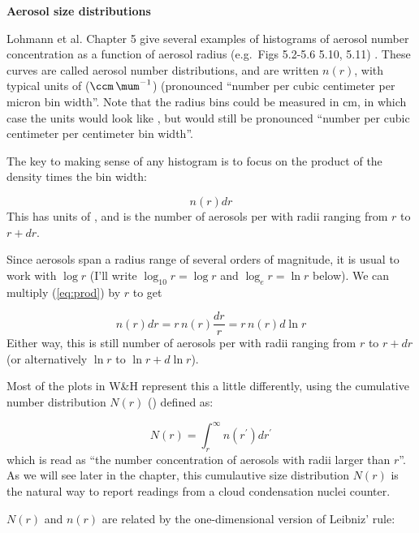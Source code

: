 \documentclass[12pt]{article}
\begin{document}
\pagestyle{first}

\vspace{0.1in}
\noindent
\textbf{Aerosol size distributions}
\vspace{0.1in}

Lohmann et al. Chapter 5  give several examples of histograms of aerosol
number concentration as a function of aerosol radius (e.g.~Figs 5.2-5.6
5.10, 5.11) .  These curves are called aerosol number distributions,
and are written $n(r)$, with typical units of ($\ccm\, \mum^{-1}$)
(pronounced ``number per cubic centimeter per micron bin width''.
Note that the radius bins could be measured in cm, in which case the
units would look like , but would still be pronounced
``number per cubic centimeter per centimeter bin width''.

The key to making sense of any histogram is to focus on the product of
the density times the bin width:

\begin{equation}
  \label{eq:prod}
  n(r)dr
\end{equation}
This has units of \ccm, and is the number of aerosols per \cc with radii
ranging from $r$ to $r+dr$.

Since aerosols span a radius range of several orders of magnitude, it is
usual to work with $\log r$ (I'll write $\log_{10} r=\log r$ and
$\log_e r = \ln r$ below).  We can multiply (\ref{eq:prod}) by $r$ to get

\begin{equation}
  \label{eq:prod}
  n(r)dr = r\,n(r) \frac{dr}{r} = r\,n(r) d\ln r
\end{equation}
Either way, this is still number of aerosols per \cc with radii
ranging from $r$ to $r+dr$ (or alternatively $\ln r$ to $\ln r + d\ln r$).

Most of the plots in W\&H represent this a little differently, using
the cumulative number distribution $N(r)$ (\ccm) defined as:

\begin{equation}
  \label{eq:cum}
  N(r) = \int_r^\infty n(r^\prime) dr^\prime
\end{equation}
which is read as ``the number concentration of aerosols with radii
larger than $r$''.   As we will see later in the chapter, this cumulautive size
distribution $N(r)$ is the natural way to report readings from a cloud condensation
nuclei counter.

$N(r)$ and $n(r)$ are related by the one-dimensional version of Leibniz' rule:
\end{document}

